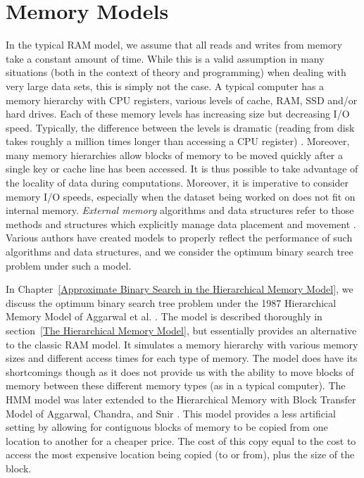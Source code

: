 \documentclass[letterpaper,12pt,titlepage,oneside,final]{book}
\theoremstyle{plain}
\begin{document}
\section{Memory Models}

In the typical RAM model, we assume that all reads and writes from memory take a constant amount of time. While this is a valid assumption in many situations (both in the context of theory and programming) when dealing with very large data sets, this is simply not the case. A typical computer has a memory hierarchy with CPU registers, various levels of cache, RAM, SSD and/or hard drives. Each of these memory levels has increasing size but decreasing I/O speed. Typically, the difference between the levels is dramatic (reading from disk takes roughly a million times longer than accessing a CPU register) \cite{vitter2001external}. Moreover, many memory hierarchies allow blocks of memory to be moved quickly after a single key or cache line has been accessed. It is thus possible to take advantage of the locality of data during computations. Moreover, it is imperative to consider memory I/O speeds, especially when the dataset being worked on does not fit on internal memory. \textit{External memory} algorithms and data structures refer to those methods and structures which explicitly manage data placement and movement \cite{vitter2001external}. Various authors have created models to properly reflect the performance of such algorithms and data structures, and we consider the optimum binary search tree problem under such a model.

In Chapter~\ref{Approximate Binary Search in the Hierarchical Memory Model}, we discuss the optimum binary search tree problem under the 1987 Hierarchical Memory Model of Aggarwal et al. \cite{aggarwal1987model}. The model is described thoroughly in section~\ref{The Hierarchical Memory Model}, but essentially provides an alternative to the classic RAM model. It simulates a memory hierarchy with various memory sizes and different access times for each type of memory. The model does have its shortcomings though as it does not provide us with the ability to move blocks of memory between these different memory types (as in a typical computer). The HMM model was later extended to the Hierarchical Memory with Block Transfer Model of Aggarwal, Chandra, and Snir \cite{aggarwal1987hierarchical}. This model provides a less artificial setting by allowing for contiguous blocks of memory to be copied from one location to another for a cheaper price. The cost of this copy equal to the cost to access the most expensive location being copied (to or from), plus the size of the block.
\end{document}
